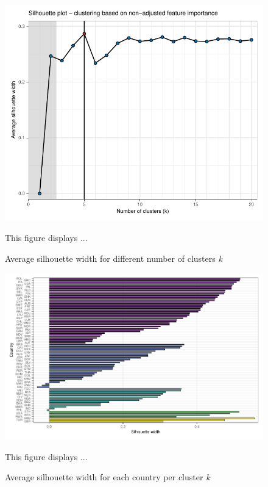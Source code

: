 \documentclass[12pt, a4paper]{article}
\newenvironment{subcaption}
{\strut
\vspace{-5pt}
\begin{minipage}[b]{0.9\textwidth}
  \hspace*{-\parindent}
  \footnotesize}
 {\end{minipage}}
\begin{document}
 \begin{figure}[ht!]
   \centering
   \caption{Average silhouette width for different number of clusters \textit{k}} \label{fig:G1_silhouette}
   \includegraphics{Figures_Appendix/Figure_Silhouette_1}
   \begin{subcaption}
     This figure displays ...
   \end{subcaption}
 \end{figure}

 \clearpage

 \begin{figure}[ht!]
   \centering
   \caption{Average silhouette width for each country per cluster \textit{k}} \label{fig:G2_silhouette}
   \includegraphics{Figures_Appendix/Figure_Silhouette_Clusters_1}
   \begin{subcaption}
     This figure displays ...
   \end{subcaption}
 \end{figure}
\end{document}
